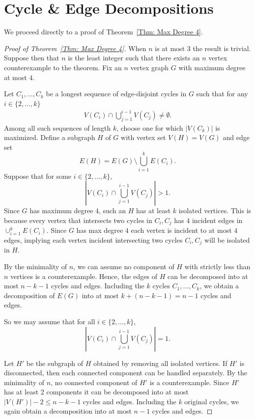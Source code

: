\documentclass[11pt]{amsart}
\theoremstyle{definition}
\begin{document}
\section{Cycle \& Edge Decompositions}
\label{Sec: Normal Problem}


We proceed directly to a proof of Theorem~\ref{Thm: Max Degree 4}.

\begin{proof}[Proof of Theorem~\ref{Thm: Max Degree 4}]
When $n$ is at most $3$ the result is trivial. 
Suppose then that $n$ is the least integer such that there exists an $n$ vertex counterexample to the theorem.
Fix an $n$ vertex graph $G$ with maximum degree at most $4$.

Let $C_1, \ldots, C_k$ be a longest sequence of edge-disjoint cycles in $G$ such that for any $i \in \{ 2,\ldots, k \}$
\begin{align*}
    V(C_i) \cap \bigcup_{j=1}^{i-1} V(C_j) \neq \emptyset.
\end{align*}
Among all such sequences of length $k$, choose one for which $|V(C_k)|$ is maximized.
Define a subgraph $H$ of $G$ with vertex set $V(H)=V(G)$ and edge set
$$E(H)=E(G) \setminus \bigcup_{i=1}^{k} E(C_i).$$
Suppose that for some $i \in \{2,\ldots,k\}$,
$$|V(C_i) \cap \bigcup_{j=1}^{i-1} V(C_j)| > 1.$$
Since $G$ has maximum degree $4$, such an $H$ has at least $k$ isolated vertices.
This is because every vertex that intersects two cycles in $C_i,C_j$ 
has $4$ incident edges in $\cup_{i=1}^k E(C_i)$.
Since $G$ has max degree $4$ each vertex is incident to at most $4$ edges,
implying each vertex incident intersecting two cycles $C_i,C_j$ will be isolated in $H$.

By the minimality of $n$, we can assume no component of $H$ with strictly less than $n$ vertices is a counterexample.
Hence, the edges of $H$ can be decomposed into at most $n-k-1$ cycles and edges. 
Including the $k$ cycles $C_1, \ldots, C_k$, we obtain a decomposition of $E(G)$ into at most
$k + (n - k - 1) = n - 1$
cycles and edges.

So we may assume that for all $i \in \{2,\ldots,k\}$,
$$|V(C_i) \cap \bigcup_{j=1}^{i-1} V(C_j)| = 1.$$


Let $H'$ be the subgraph of $H$ obtained by removing all isolated vertices. 
If $H'$ is disconnected, then each connected component can be handled separately. 
By the minimality of $n$, no connected component of $H'$ is a counterexample.
Since $H'$ has at least 2 components it can be decomposed into at most $|V(H')|-2 \leq n - k - 1$ cycles and edges. 
Including the $k$ original cycles, we again obtain a decomposition into at most $n - 1$ cycles and edges.


\end{proof}
\end{document}
